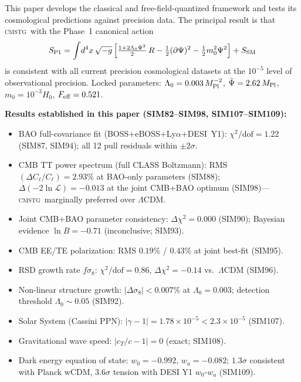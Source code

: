 \documentclass[12pt,a4paper]{article}
\newcommand{\CMSTG}{\textsc{cmstg}}
\newcommand{\Psibar}{\bar\Psi}
\newcommand{\Feff}{F_{\rm eff}}
\newcommand{\Lz}{\Lambda_0}
\newcommand{\Mpl}{M_{\rm Pl}}
\begin{document}
This paper develops the classical and free-field-quantized framework and
tests its cosmological predictions against precision data. The principal
result is that \CMSTG\ with the Phase~1 canonical action
\begin{equation}
  S_{\rm P1} = \int\!d^4x\,\sqrt{-g}\,\Bigl[
    \tfrac{1+2\Lz\Psi^2}{2}\,R
    - \tfrac{1}{2}(\partial\Psi)^2
    - \tfrac{1}{2}m_0^2\Psi^2
  \Bigr] + S_{\rm SM}
  \label{eq:phase1-action}
\end{equation}
is consistent with all current precision cosmological datasets at the
$10^{-5}$ level of observational precision. Locked parameters:
$\Lz = 0.003\,\Mpl^{-2}$, $\Psibar = 2.62\,\Mpl$, $m_0 = 10^{-3}H_0$,
$\Feff = 0.521$.

\medskip
\noindent\textbf{Results established in this paper (SIM82--SIM98, SIM107--SIM109):}
\begin{itemize}
  \item BAO full-covariance fit (BOSS+eBOSS+Ly$\alpha$+DESI~Y1):
        $\chi^2/\mathrm{dof} = 1.22$ (SIM87, SIM94); all 12 pull residuals
        within $\pm2\sigma$.
  \item CMB TT power spectrum (full CLASS Boltzmann):
        RMS$(\Delta C_\ell/C_\ell) = 2.93\%$ at BAO-only parameters (SIM88);
        $\Delta(-2\ln\mathcal{L}) = -0.013$ at the joint CMB+BAO optimum
        (SIM98)---\CMSTG\ marginally preferred over $\Lambda$CDM.
  \item Joint CMB+BAO parameter consistency: $\Delta\chi^2 = 0.000$ (SIM90);
        Bayesian evidence $\ln B = -0.71$ (inconclusive; SIM93).
  \item CMB EE/TE polarization: RMS $0.19\%$ / $0.43\%$ at joint best-fit
        (SIM95).
  \item RSD growth rate $f\sigma_8$: $\chi^2/\mathrm{dof} = 0.86$,
        $\Delta\chi^2 = -0.14$ vs.\ $\Lambda$CDM (SIM96).
  \item Non-linear structure growth: $|\Delta\sigma_8| < 0.007\%$ at
        $\Lz = 0.003$; detection threshold $\Lz \sim 0.05$ (SIM92).
  \item Solar System (Cassini PPN): $|\gamma - 1| = 1.78\times10^{-5} <
        2.3\times10^{-5}$ (SIM107).
  \item Gravitational wave speed: $|c_T/c - 1| = 0$ (exact; SIM108).
  \item Dark energy equation of state: $w_0 = -0.992$, $w_a = -0.082$;
        $1.3\sigma$ consistent with Planck wCDM, $3.6\sigma$ tension with
        DESI Y1 $w_0$-$w_a$ (SIM109).
\end{itemize}
\end{document}

